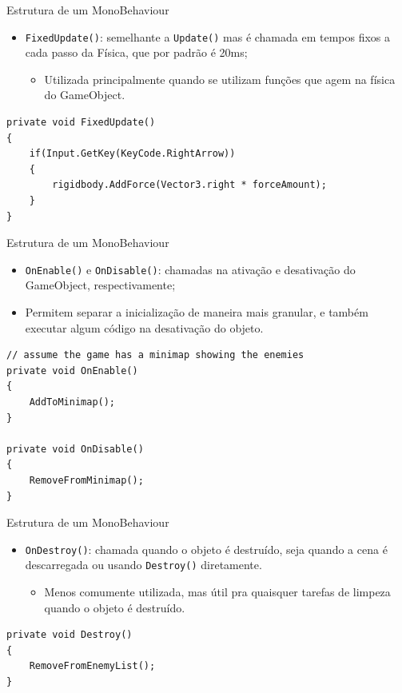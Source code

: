 \documentclass{beamer}
\begin{document}
\begin{frame}[fragile]{Estrutura de um MonoBehaviour}
	\begin{itemize}
		\item \verb|FixedUpdate()|: semelhante a \verb|Update()| mas é chamada em tempos fixos a cada passo da Física, que por padrão é 20ms;
		\begin{itemize}
			\item Utilizada principalmente quando se utilizam funções que agem na física do GameObject.
		\end{itemize}
	\end{itemize}
	\begin{lstlisting}
private void FixedUpdate()
{
	if(Input.GetKey(KeyCode.RightArrow))
	{
		rigidbody.AddForce(Vector3.right * forceAmount);
	}
}
	\end{lstlisting}
\end{frame}


\begin{frame}[fragile]{Estrutura de um MonoBehaviour}
	\begin{itemize}
		\item \verb|OnEnable()| e \verb|OnDisable()|: chamadas na ativação e desativação do GameObject, respectivamente;
		\item Permitem separar a inicialização de maneira mais granular, e também executar algum código na desativação do objeto.
	\end{itemize}
	
	\begin{lstlisting}
// assume the game has a minimap showing the enemies
private void OnEnable()
{
	AddToMinimap();
}

private void OnDisable()
{
	RemoveFromMinimap();
}
	\end{lstlisting}
\end{frame}


\begin{frame}[fragile]{Estrutura de um MonoBehaviour}
	\begin{itemize}
		\item \verb|OnDestroy()|: chamada quando o objeto é destruído, seja quando a cena é descarregada ou usando \verb|Destroy()| diretamente.
		\begin{itemize}
			\item Menos comumente utilizada, mas útil pra quaisquer tarefas de limpeza quando o objeto é destruído.
		\end{itemize}
	\end{itemize}
	\begin{lstlisting}
private void Destroy()
{
	RemoveFromEnemyList();
}
	\end{lstlisting}
\end{frame}
\end{document}
